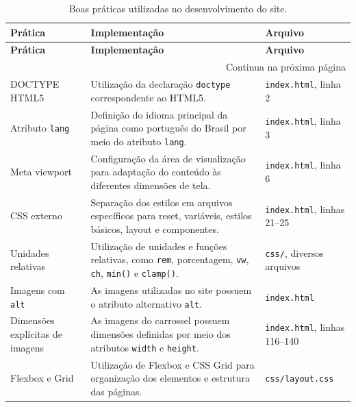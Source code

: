 \begin{longtable}{p{3.2cm} p{7.2cm} p{3.0cm}}
	
	\caption{Boas práticas utilizadas no desenvolvimento do site.}
	\label{tab:boas-praticas}
	\\
	
	\toprule
	\textbf{Prática} &
	\textbf{Implementação} &
	\textbf{Arquivo} \\
	\midrule
	\endfirsthead
	
	\toprule
	\textbf{Prática} &
	\textbf{Implementação} &
	\textbf{Arquivo} \\
	\midrule
	\endhead
	
	\midrule
	\multicolumn{3}{r}{Continua na próxima página} \\
	\endfoot
	
	\bottomrule
	\endlastfoot
	
	DOCTYPE HTML5 &
	Utilização da declaração \texttt{doctype} correspondente ao HTML5. &
	\texttt{index.html}, linha 2 \\
	
	Atributo \texttt{lang} &
	Definição do idioma principal da página como português do Brasil por meio do atributo \texttt{lang}. &
	\texttt{index.html}, linha 3 \\
	
	Meta viewport &
	Configuração da área de visualização para adaptação do conteúdo às diferentes dimensões de tela. &
	\texttt{index.html}, linha 6 \\
	
	CSS externo &
	Separação dos estilos em arquivos específicos para reset, variáveis, estilos básicos, layout e componentes. &
	\texttt{index.html}, linhas 21--25 \\
	
	Unidades relativas &
	Utilização de unidades e funções relativas, como \texttt{rem}, porcentagem, \texttt{vw}, \texttt{ch}, \texttt{min()} e \texttt{clamp()}. &
	\texttt{css/}, diversos arquivos \\
	
	Imagens com \texttt{alt} &
	As imagens utilizadas no site possuem o atributo alternativo \texttt{alt}. &
	\texttt{index.html} \\
	
	Dimensões explícitas de imagens &
	As imagens do carrossel possuem dimensões definidas por meio dos atributos \texttt{width} e \texttt{height}. &
	\texttt{index.html}, linhas 116--140 \\
	
	Flexbox e Grid &
	Utilização de Flexbox e CSS Grid para organização dos elementos e estrutura das páginas. &
	\texttt{css/layout.css} \\
	

\end{longtable}
